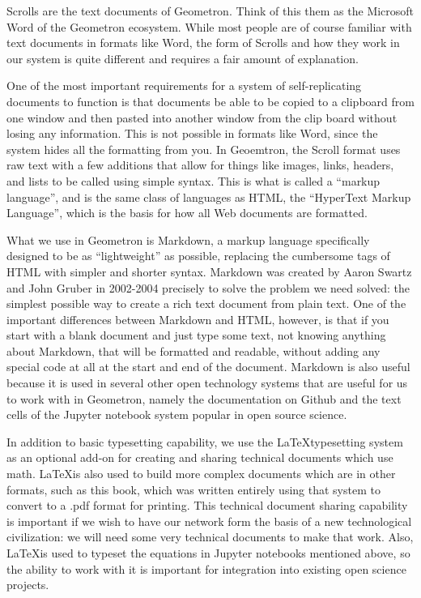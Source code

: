 

Scrolls are the text documents of Geometron.  Think of this them as the
Microsoft Word of the Geometron ecosystem. While most people are of course familiar with text documents in formats like Word, the form of Scrolls and how they work in our system is quite different and requires a fair amount of explanation.

One of the most important requirements for a system of self-replicating documents to function is that documents be able to be copied to a clipboard from one window and then pasted into another window from the clip board without losing any information.  This is not possible in formats like Word, since the system hides all the formatting from you.  In Geoemtron, the Scroll format uses raw text with a few additions that allow for things like images, links, headers, and lists to be called using simple syntax.  This is what is called a ``markup language'', and is the same class of languages as HTML, the ``HyperText Markup Language'', which is the basis for how all Web documents are formatted.  

What we use in Geometron is Markdown, a markup language specifically designed to be as ``lightweight'' as possible, replacing the cumbersome tags of HTML with simpler and shorter syntax.  Markdown was created by Aaron Swartz and John Gruber in 2002-2004 precisely to solve the problem we need solved: the simplest possible way to create a rich text document from plain text.  One of the important differences between Markdown and HTML, however, is that if you start with a blank document and just type some text, not knowing anything about Markdown, that will be formatted and readable, without adding any special code at all at the start and end of the document.  Markdown is also useful because it is used in several other open technology systems that are useful for us to work with in Geometron, namely the documentation on Github and the text cells of the Jupyter notebook system popular in open source science.  

In addition to basic typesetting capability, we use the \LaTeX typesetting system as an optional add-on for creating and sharing technical documents which use math. \LaTeX is also used to build more complex documents which are in other formats, such as this book, which was written entirely using that system to convert to a .pdf format for printing.  This technical document sharing capability is important if we wish to have our network form the basis of a new technological civilization: we will need some very technical documents to make that work.  Also, \LaTeX is used to typeset the equations in Jupyter notebooks mentioned above, so the ability to work with it is important for integration into existing open science projects.

